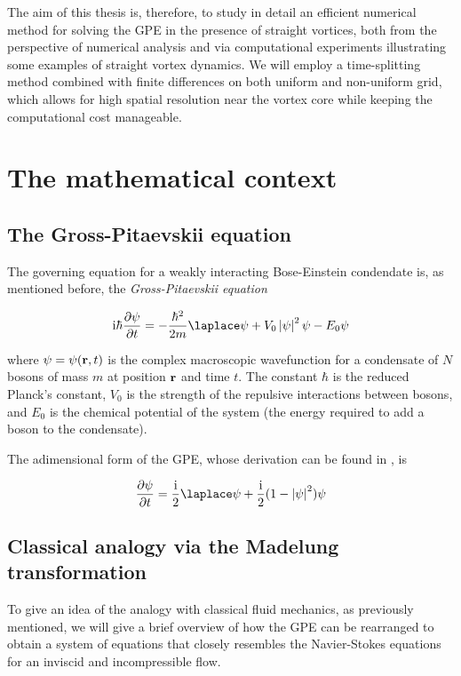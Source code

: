 The aim of this thesis is, therefore, to study in detail an efficient numerical method for solving the GPE in the presence of straight vortices, both from the perspective of numerical analysis and via computational experiments illustrating some examples of straight vortex dynamics. We will employ a time-splitting method combined with finite differences on both uniform and non-uniform grid, which allows for high spatial resolution near the vortex core while keeping the computational cost manageable.

\newpage

\section{The mathematical context}

\subsection{The Gross-Pitaevskii equation}

The governing equation for a weakly interacting Bose-Einstein condendate is, as mentioned before, the \emph{Gross-Pitaevskii equation}

\begin{equation*}
    \ii \hbar \pdv{\psi}{t} = -\frac{\hbar^2}{2m}\lap\psi + V_0\abs{\psi}^2 \psi - E_0 \psi
\end{equation*}

where $\psi = \psi(\mathbf{r}, t)$ is the complex macroscopic wavefunction for a condensate of $N$ bosons of mass $m$ at position $\mathbf{r}$ and time $t$. The constant $\hbar$ is the reduced Planck's constant, $V_0$ is the strength of the repulsive interactions between bosons, and $E_0$ is the chemical potential of the system (the energy required to add a boson to the condensate).

The adimensional form of the GPE, whose derivation can be found in \cite{CZ12}, is

\begin{equation}
    \pdv{\psi}{t} = \frac\ii2\lap\psi + \frac\ii2 (1 - \abs{\psi}^2)\psi
    \label{eq:gpe}
\end{equation}

\subsection{Classical analogy via the Madelung transformation}

To give an idea of the analogy with classical fluid mechanics, as previously mentioned, we will give a brief overview of how the GPE can be rearranged to obtain a system of equations that closely resembles the Navier-Stokes equations for an inviscid and incompressible flow.

